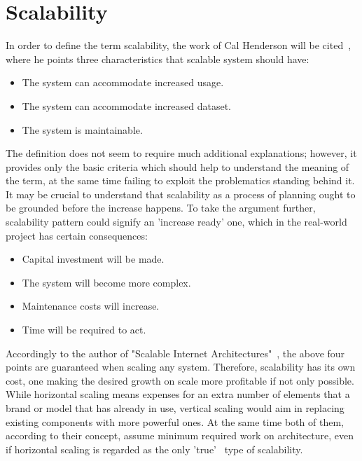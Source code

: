 \section{Scalability}\label{sec:scalability}
In order to define the term scalability, the work of Cal Henderson will be cited~\cite[pages 203--204]{build_scalable}, where he points three characteristics that scalable system should have:
\begin{itemize}
\item{The system can accommodate increased usage.}
\item{The system can accommodate increased dataset.}
\item{The system is maintainable.}
\end{itemize}
The definition does not seem to require much additional explanations; however, it provides only the basic criteria which should help to understand the meaning of the term, at the same time failing to exploit the problematics standing behind it. It may be crucial to understand that scalability as a process of planning ought to be grounded before the increase happens. To take the argument further, scalability pattern could signify an 'increase ready' one, which in the real-world project has certain consequences:
\begin{itemize}
\item{Capital investment will be made.}
\item{The system will become more complex.}
\item{Maintenance costs will increase.}
\item{Time will be required to act.}
\end{itemize}
Accordingly to the author of  "Scalable Internet Architectures"~\cite[page 8]{scalable_arch}, the above four points are guaranteed when scaling any system. Therefore, scalability has its own cost, one making the desired growth on scale more profitable if not only possible. While horizontal scaling means expenses for an extra number of elements that a brand or model that has already in use, vertical scaling would aim in replacing existing components with more powerful ones. At the same time both of them, according to their concept, assume minimum required work on architecture, even if horizontal scaling is regarded as the only 'true'~\cite[page 5]{scalable_arch} type of scalability. 

